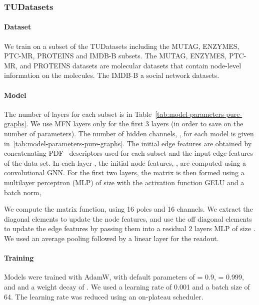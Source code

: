 \documentclass{article} \usepackage{iclr2024_conference,times}
\begin{document}
\subsubsection{TUDatasets}

\paragraph{Dataset} We train on a subset of the TUDatasets including the MUTAG, ENZYMES, PTC-MR, PROTEINS and IMDB-B subsets. The MUTAG, ENZYMES, PTC-MR, and PROTEINS datasets are molecular datasets that contain node-level information on the molecules. The IMDB-B a social network datasets.

\paragraph{Model}
The number of layers for each subset is in Table~\ref{tab:model-parameters-pure-graphs}.
We use MFN layers only for the first 3 layers (in order to save on the number of parameters). The number of hidden channels, , for each model is given in~\ref{tab:model-parameters-pure-graphs}.
The initial edge features  are obtained by concatenating PDF~\cite{yang2023better} descriptors used for each subset and the input edge features of the data set.  In each layer , the initial node features, , are computed using a convolutional GNN. 
For the first two layers, the matrix is then formed using a multilayer perceptron (MLP) of size  with the activation function GELU and a batch norm,

We compute the matrix function, using 16 poles and 16 channels. We extract the diagonal elements to update the node features, and use the off diagonal elements to update the edge features by passing them into a residual 2 layers MLP of size . We used an average pooling followed by a linear layer for the readout.
\vspace{-8pt}
\paragraph{Training}
 Models were trained with AdamW,
with default parameters of  = 0.9,  = 0.999, and  and a weight decay of .
We used a learning rate of 0.001 and a batch size of 64.
The learning rate was reduced using an on-plateau scheduler. 
\end{document}
